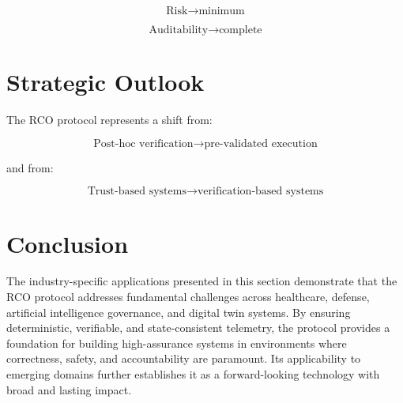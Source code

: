 \begin{equation}
\text{Risk} \rightarrow \text{minimum}
\end{equation}

\begin{equation}
\text{Auditability} \rightarrow \text{complete}
\end{equation}

\section{Strategic Outlook}

The RCO protocol represents a shift from:

\begin{equation}
\text{Post-hoc verification} \rightarrow \text{pre-validated execution}
\end{equation}

and from:

\begin{equation}
\text{Trust-based systems} \rightarrow \text{verification-based systems}
\end{equation}

\section{Conclusion}

The industry-specific applications presented in this section demonstrate that the RCO protocol addresses fundamental challenges across healthcare, defense, artificial intelligence governance, and digital twin systems. By ensuring deterministic, verifiable, and state-consistent telemetry, the protocol provides a foundation for building high-assurance systems in environments where correctness, safety, and accountability are paramount. Its applicability to emerging domains further establishes it as a forward-looking technology with broad and lasting impact.